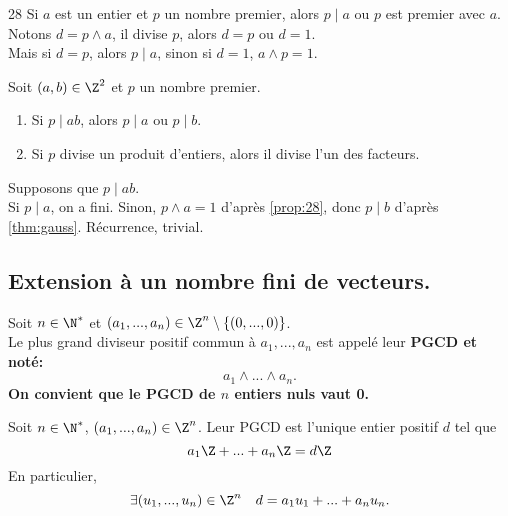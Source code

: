 \documentclass[11pt]{article}
\begin{document}
\begin{prop}{}{28}
    Si $a$ est un entier et $p$ un nombre premier, alors $p\mid a$ ou $p$ est premier avec $a$.
    \tcblower
    Notons $d=p\land a$, il divise $p$, alors $d=p$ ou $d=1$.\\
    Mais si $d=p$, alors $p\mid a$, sinon si $d=1$, $a\land p=1$.
\end{prop}

\begin{prop}{}{}
    Soit $(a,b)\in\Z^2$ et $p$ un nombre premier.
    \begin{enumerate}[topsep=0pt,itemsep=-0.9 ex]
        \item Si $p\mid ab$, alors $p\mid a$ ou $p\mid b$.
        \item Si $p$ divise un produit d'entiers, alors il divise l'un des facteurs.
    \end{enumerate}
    \tcblower
     Supposons que $p\mid ab$.\\
    Si $p\mid a$, on a fini. Sinon, $p\land a=1$ d'après \ref{prop:28}, donc $p\mid b$ d'après \ref{thm:gauss}.\n 
     Récurrence, trivial.
\end{prop}

\subsection{Extension à un nombre fini de vecteurs.}

\begin{defi}{}{}
    Soit $n\in\N^*$ et $(a_1,...,a_n)\in\Z^n\setminus\{(0,...,0)\}$.\\
    Le plus grand diviseur positif commun à $a_1,...,a_n$ est appelé leur \bf{PGCD} et noté:
    \begin{equation*}
        a_1\land ... \land a_n.
    \end{equation*}
    On convient que le PGCD de $n$ entiers nuls vaut 0.
\end{defi}

\begin{prop}{}{}
    Soit $n\in\N^*$, $(a_1,...,a_n)\in\Z^n$. Leur PGCD est l'unique entier positif $d$ tel que
    \begin{equation*}
        a_1\Z+...+a_n\Z=d\Z
    \end{equation*}
    En particulier,
    \begin{equation*}
        \exists(u_1,...,u_n)\in\Z^n\quad d=a_1u_1+...+a_nu_n.
    \end{equation*}
\end{prop}
\end{document}
